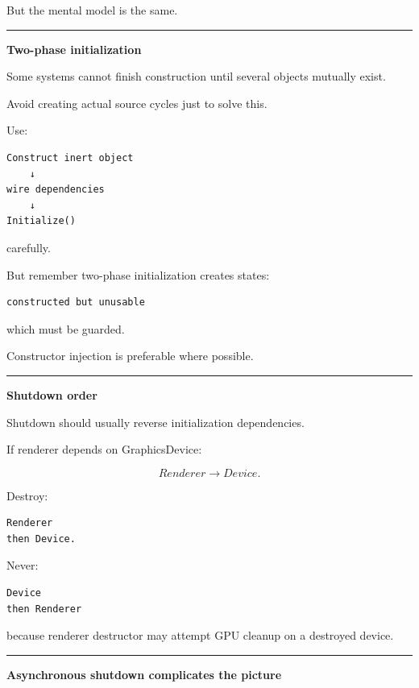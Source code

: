 But the mental model is the same.

\begin{center}\rule{0.5\linewidth}{0.5pt}\end{center}

\textbf{Two-phase initialization}

Some systems cannot finish construction until several objects mutually exist.

Avoid creating actual source cycles just to solve this.

Use:

\begin{verbatim}
Construct inert object
    ↓
wire dependencies
    ↓
Initialize()
\end{verbatim}

carefully.

But remember two-phase initialization creates states:

\begin{verbatim}
constructed but unusable
\end{verbatim}

which must be guarded.

Constructor injection is preferable where possible.

\begin{center}\rule{0.5\linewidth}{0.5pt}\end{center}

\textbf{Shutdown order}

Shutdown should usually reverse initialization dependencies.

If renderer depends on GraphicsDevice:

\[
Renderer\rightarrow Device.
\]

Destroy:

\begin{verbatim}
Renderer
then Device.
\end{verbatim}

Never:

\begin{verbatim}
Device
then Renderer
\end{verbatim}

because renderer destructor may attempt GPU cleanup on a destroyed device.

\begin{center}\rule{0.5\linewidth}{0.5pt}\end{center}

\textbf{Asynchronous shutdown complicates the picture}

